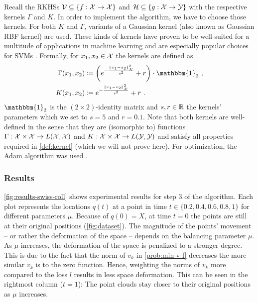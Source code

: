 Recall the RKHSs $\mathcal{V} \subseteq \{f: \mathcal{X} \rightarrow \mathcal{X}\}$ and $\mathcal{H} \subseteq \{g: \mathcal{X} \rightarrow \mathcal{Y}\}$ with the respective kernels $\Gamma$ and $K$.
In order to implement the algorithm, we have to choose those kernels.
For both $K$ and $\Gamma$, variants of a Gaussian kernel (also known as Gaussian RBF kernel) are used.
These kinds of kernels have proven to be well-suited for a multitude of applications in machine learning and are especially popular choices for SVMs \cite{steinwart08}. 
Formally, for $x_1, x_2 \in \mathcal{X}$ the kernels are defined as
\begin{align}
	\Gamma(x_1, x_2) &\coloneqq \left(e^{-\frac{\norm{x_1 - x_2}_\cX^2}{s^2}} + r\right) \cdot \mathbbm{1}_2 \ ,\\
	K(x_1, x_2) &\coloneqq e^{-\frac{\norm{x_1 - x_2}_\cX^2}{s^2}} + r \ .
\end{align}
$\mathbbm{1}_2$ is the $(2\times2)$-identity matrix and $s, r \in \mathbb{R}$ the kernels' parameters which we set to $s = 5$ and $r = 0.1$.
Note that both kernels are well-defined in the sense that they are (isomorphic to) functions $\Gamma: \mathcal{X} \times \mathcal{X} \rightarrow L(\mathcal{X}, \mathcal{X})$ and $K: \mathcal{X} \times \mathcal{X} \rightarrow L(\mathcal{Y}, \mathcal{Y})$ and satisfy all properties required in \cref{def:kernel} (which we will not prove here).
For optimization, the Adam algorithm was used \cite{kingma17}.

\subsubsection{Results}



\cref{fig:results-swiss-roll} shows experimental results for step 3 of the algorithm.
Each plot represents the locations $q(t)$ at a point in time $t \in \{0.2, 0.4, 0.6, 0.8, 1\}$ for different parameters $\mu$.
Because of $q(0) = X$, at time $t = 0$ the points are still at their original positions (\cref{fig:dataset}).
The magnitude of the points' movement -- or rather the deformation of the space -- depends on the balancing parameter $\mu$.
As $\mu$ increases, the deformation of the space is penalized to a stronger degree.
This is due to the fact that the norm of $v_k$ in \cref{prob:min-v-f} decreases the more similar $v_k$ is to the zero function.
Hence, weighting the norms of $v_k$ more compared to the loss $l$ results in less space deformation.
This can be seen in the rightmost column ($t=1$):
The point clouds stay closer to their original positions as $\mu$ increases.

